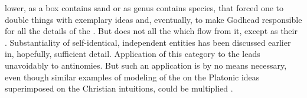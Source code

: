 lower, as a box contains sand or as genus contains species, that forced one to
double things with exemplary ideas and, eventually, to make Godhead responsible
for all the details of the .  But  does not
 all the  which flow from it, except as their
 .  {Substantiality} of self-identical, independent
entities has been discussed earlier in, hopefully, sufficient detail.
Application of this category to the  leads unavoidably to
antinomies.  But such an application is by no means necessary, even though
similar examples of modeling  of the  on the
Platonic ideas superimposed on the Christian intuitions, could be multiplied
.

